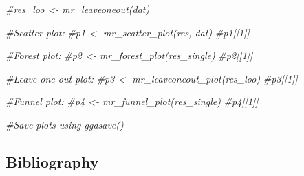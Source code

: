 \documentclass[
]{article}
\newenvironment{Shaded}{\begin{snugshade}}{\end{snugshade}}
\newcommand{\CommentTok}[1]{\textcolor[rgb]{0.56,0.35,0.01}{\textit{#1}}}
\begin{document}
\begin{Shaded}
\begin{Highlighting}[]
\CommentTok{\#res\_loo \textless{}{-} mr\_leaveoneout(dat)}

\CommentTok{\#Scatter plot:}
\CommentTok{\#p1 \textless{}{-} mr\_scatter\_plot(res, dat)}
\CommentTok{\#p1[[1]]}

\CommentTok{\#Forest plot:}
\CommentTok{\#p2 \textless{}{-} mr\_forest\_plot(res\_single)}
\CommentTok{\#p2[[1]]}

\CommentTok{\#Leave{-}one{-}out plot: }
\CommentTok{\#p3 \textless{}{-} mr\_leaveoneout\_plot(res\_loo)}
\CommentTok{\#p3[[1]]}

\CommentTok{\#Funnel plot:}
\CommentTok{\#p4 \textless{}{-} mr\_funnel\_plot(res\_single)}
\CommentTok{\#p4[[1]]}

\CommentTok{\#Save plots using ggdsave()}
\end{Highlighting}
\end{Shaded}

\subsection*{Bibliography}\label{bibliography}
\end{document}
